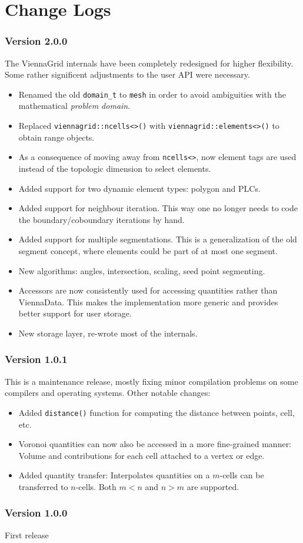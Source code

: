 
\chapter{Change Logs}

\subsection*{Version 2.0.0}
The ViennaGrid internals have been completely redesigned for higher flexibility.
Some rather significent adjustments to the user API were necessary.
\begin{itemize}
 \item Renamed the old \lstinline|domain_t| to \lstinline|mesh| in order to avoid ambiguities with the mathematical \emph{problem domain}.
 \item Replaced \lstinline|viennagrid::ncells<>()| with \lstinline|viennagrid::elements<>()| to obtain range objects.
 \item As a consequence of moving away from \lstinline|ncells<>|, now element tags are used instead of the topologic dimension to select elements.
 \item Added support for two dynamic element types: polygon and PLCs.
 \item Added support for neighbour iteration. This way one no longer needs to code the boundary/coboundary iterations by hand.
 \item Added support for multiple segmentations. This is a generalization of the old segment concept, where elements could be part of at most one segment.
 \item New algorithms: angles, intersection, scaling, seed point segmenting.
 \item Accessors are now consistently used for accessing quantities rather than ViennaData. This makes the implementation more generic and provides better support for user storage.
 \item New storage layer, re-wrote most of the internals.
\end{itemize}

\subsection*{Version 1.0.1}
This is a maintenance release, mostly fixing minor compilation problems on some compilers and operating systems. Other notable changes:
\begin{itemize}
  \item Added \lstinline|distance()| function for computing the distance between points, cell, etc.
  \item Voronoi quantities can now also be accessed in a more fine-grained manner: Volume and contributions for each cell attached to a vertex or edge.
  \item Added quantity transfer: Interpolates quantities on a $m$-cells can be transferred to $n$-cells. Both $m<n$ and $n>m$ are supported.
\end{itemize}

\subsection*{Version 1.0.0}
First release
